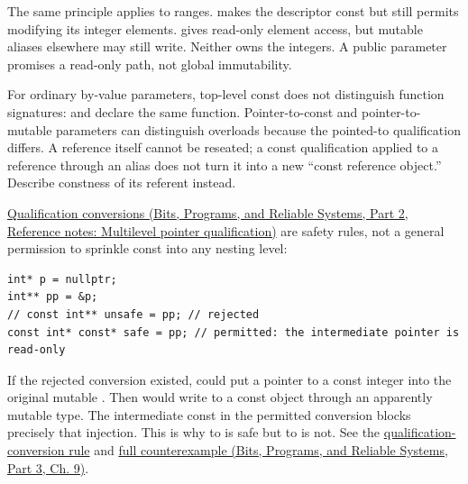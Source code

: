 The same principle applies to ranges.  makes the descriptor const but still permits modifying its integer elements.  gives read-only element access, but mutable aliases elsewhere may still write. Neither owns the integers. A public  parameter promises a read-only path, not global immutability.

For ordinary by-value parameters, top-level const does not distinguish function signatures:  and  declare the same function. Pointer-to-const and pointer-to-mutable parameters can distinguish overloads because the pointed-to qualification differs. A reference itself cannot be reseated; a const qualification applied to a reference through an alias does not turn it into a new ``const reference object.'' Describe constness of its referent instead.

\href{../01-Bits-Programs-and-Reliable-Systems-P02/main.pdf\#appendix-5e1a7561cd98}{Qualification conversions (Bits, Programs, and Reliable Systems, Part 2, Reference notes: Multilevel pointer qualification)} are safety rules, not a general permission to sprinkle const into any nesting level:

\begin{verbatim}
int* p = nullptr;
int** pp = &p;
// const int** unsafe = pp; // rejected
const int* const* safe = pp; // permitted: the intermediate pointer is read-only
\end{verbatim}

If the rejected conversion existed,  could put a pointer to a const integer into the original mutable . Then  would write to a const object through an apparently mutable type. The intermediate const in the permitted conversion blocks precisely that injection. This is why  to  is safe but  to  is not. See the \href{https://eel.is/c++draft/conv.qual}{qualification-conversion rule} and \href{../01-Bits-Programs-and-Reliable-Systems-P03/main.pdf\#01-foundations-i-ch011-c---qualification-safety-and-borrow-intervals}{full counterexample (Bits, Programs, and Reliable Systems, Part 3, Ch. 9)}.

